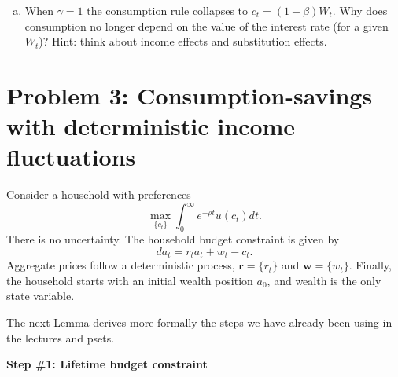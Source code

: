 \documentclass[11pt]{extarticle}
\theoremstyle{plain}
\theoremstyle{definition}
\begin{document}
\begin{enumerate}[(a)]
\item When $\gamma = 1$ the consumption rule collapses to $c_t = (1-\beta) W_t$. Why does consumption no longer depend on the value of the interest rate (for a given $W_t$)? Hint: think about income effects and substitution effects.
\end{enumerate}




\vspace{5mm}
\section*{Problem 3: Consumption-savings with deterministic income fluctuations}

Consider a household with preferences 
\begin{equation*}
	\max_{\{c_t\}} \int_0^\infty e^{- \rho t} u(c_t) dt. 
\end{equation*}
There is no uncertainty. The household budget constraint is given by
\begin{equation*}
	da_t = r_t a_t + w_t - c_t. 
\end{equation*}
Aggregate prices follow a deterministic process, $\bm{r} = \{r_t\}$ and $\bm{w} = \{w_t\}$. Finally, the household starts with an initial wealth position $a_0$, and wealth is the only state variable. 

The next Lemma derives more formally the steps we have already been using in the lectures and psets.


\vspace{5mm}
\noindent
\textbf{Step \#1: Lifetime budget constraint}
\end{document}
